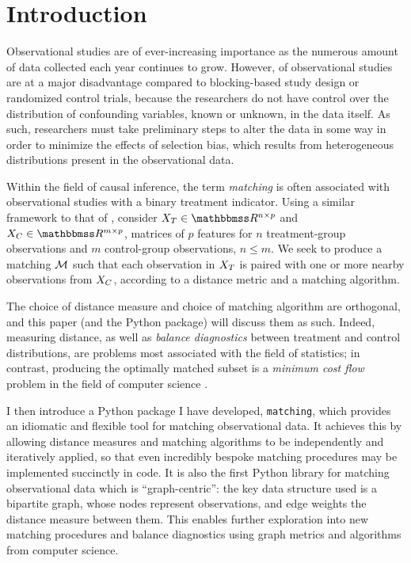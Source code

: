 \documentclass[11pt]{extarticle}
\begin{document}
\tableofcontents{}
\newpage{}


\section{Introduction}
\label{sec:intro}

Observational studies are of ever-increasing importance as the numerous amount of data collected each year continues to grow.
However, of observational studies are at a major disadvantage compared to blocking-based study design or randomized control trials, because the researchers do not have control over the distribution of confounding variables, known or unknown, in the data itself. As such, researchers must take preliminary steps to alter the data in some way in order to minimize the effects of selection bias, which results from heterogeneous distributions present in the observational data.

Within the field of causal inference, the term \emph{matching} is often associated with observational studies with a binary treatment indicator.
Using a similar framework to that of \textcite{iacus_multivariate_2011}, consider $\mat{X}_T \in \reals^{n \times p}$ and $\mat{X}_C \in \reals^{m \times p}$, matrices of $p$ features for $n$ treatment-group observations and $m$ control-group observations, $n \leq m$.
We seek to produce a matching $\mathcal{M}$ such that each observation in $X_T$ is paired with one or more nearby observations from $X_C$, according to a distance metric and a matching algorithm.

The choice of distance measure and choice of matching algorithm are orthogonal, and this paper (and the Python package) will discuss them as such. Indeed, measuring distance, as well as \emph{balance diagnostics} between treatment and control distributions, are problems most associated with the field of statistics; in contrast, producing the optimally matched subset is a \emph{minimum cost flow} problem in the field of computer science \parencite{rosenbaum_optimal_1989}.

I then introduce a Python package I have developed, \texttt{matching}, which provides an idiomatic and flexible tool for matching observational data. It achieves this by allowing distance measures and matching algorithms to be independently and iteratively applied, so that even incredibly bespoke matching procedures may be implemented succinctly in code. It is also the first Python library for matching observational data which is ``graph-centric'': the key data structure used is a bipartite graph, whose nodes represent observations, and edge weights the distance measure between them. This enables further exploration into new matching procedures and balance diagnostics using graph metrics and algorithms from computer science.
\end{document}
